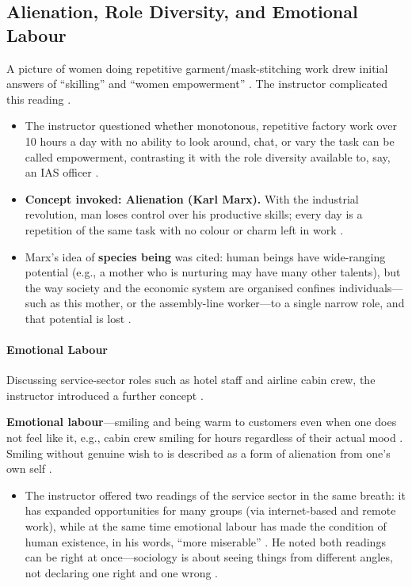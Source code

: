 \subsection{Alienation, Role Diversity, and Emotional Labour}
A picture of women doing repetitive garment/mask-stitching work drew initial answers of ``skilling'' and ``women empowerment'' . The instructor complicated this reading .

\begin{CriticalPoint}
\begin{itemize}
    \item The instructor questioned whether monotonous, repetitive factory work over 10 hours a day with no ability to look around, chat, or vary the task can be called empowerment, contrasting it with the role diversity available to, say, an IAS officer .
    \item \textbf{Concept invoked: Alienation (Karl Marx).} With the industrial revolution, man loses control over his productive skills; every day is a repetition of the same task with no colour or charm left in work .
    \item Marx's idea of \textbf{species being} was cited: human beings have wide-ranging potential (e.g., a mother who is nurturing may have many other talents), but the way society and the economic system are organised confines individuals---such as this mother, or the assembly-line worker---to a single narrow role, and that potential is lost .
\end{itemize}
\end{CriticalPoint}

\paragraph{Emotional Labour}
Discussing service-sector roles such as hotel staff and airline cabin crew, the instructor introduced a further concept .

\begin{KeyConcept}
\textbf{Emotional labour}---smiling and being warm to customers even when one does not feel like it, e.g., cabin crew smiling for hours regardless of their actual mood . Smiling without genuine wish to is described as a form of alienation from one's own self .
\begin{itemize}
    \item The instructor offered two readings of the service sector in the same breath: it has expanded opportunities for many groups (via internet-based and remote work), while at the same time emotional labour has made the condition of human existence, in his words, ``more miserable'' . He noted both readings can be right at once---sociology is about seeing things from different angles, not declaring one right and one wrong .
\end{itemize}
\end{KeyConcept}

